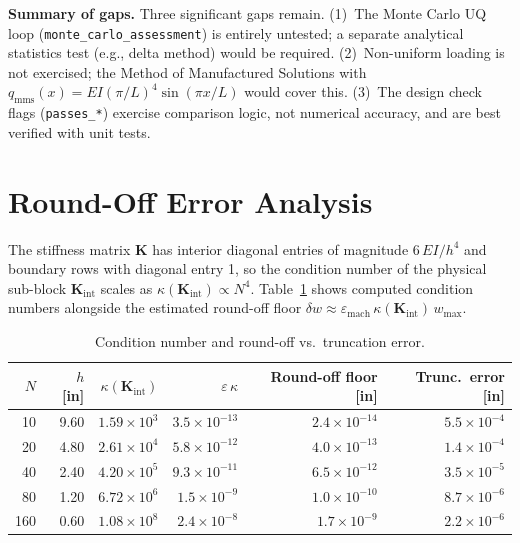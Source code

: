 \documentclass[12pt, letterpaper]{article}
\newcommand{\EI}{EI}
\begin{document}
\textbf{Summary of gaps.}
Three significant gaps remain.
(1)~The Monte Carlo UQ loop (\texttt{monte\_carlo\_assessment}) is entirely
untested; a separate analytical statistics test (e.g., delta method) would be
required.
(2)~Non-uniform loading is not exercised; the Method of Manufactured Solutions
with $q_{\mathrm{mms}}(x) = EI(\pi/L)^4\sin(\pi x/L)$ would cover this.
(3)~The design check flags (\texttt{passes\_*}) exercise comparison logic, not
numerical accuracy, and are best verified with unit tests.

\section{Round-Off Error Analysis}

The stiffness matrix $\mathbf{K}$ has interior diagonal entries of magnitude
$6\,\EI/h^4$ and boundary rows with diagonal entry 1, so the condition number
of the physical sub-block $\mathbf{K}_{\mathrm{int}}$ scales as
$\kappa(\mathbf{K}_{\mathrm{int}}) \propto N^4$.
Table~\ref{tab:roundoff} shows computed condition numbers alongside the
estimated round-off floor $\delta w \approx \varepsilon_{\mathrm{mach}}\,
\kappa(\mathbf{K}_{\mathrm{int}})\,w_{\max}$.

\begin{table}[ht]
\centering
\caption{Condition number and round-off vs.\ truncation error.}
\label{tab:roundoff}
\begin{tabular}{rrrrrr}
\toprule
$N$ & $h$ [in] & $\kappa(\mathbf{K}_{\mathrm{int}})$ &
$\varepsilon\,\kappa$ & Round-off floor [in] & Trunc.\ error [in] \\
\midrule
 10 & 9.60 & $1.59\times10^{3}$ & $3.5\times10^{-13}$ & $2.4\times10^{-14}$ & $5.5\times10^{-4}$ \\
 20 & 4.80 & $2.61\times10^{4}$ & $5.8\times10^{-12}$ & $4.0\times10^{-13}$ & $1.4\times10^{-4}$ \\
 40 & 2.40 & $4.20\times10^{5}$ & $9.3\times10^{-11}$ & $6.5\times10^{-12}$ & $3.5\times10^{-5}$ \\
 80 & 1.20 & $6.72\times10^{6}$ & $1.5\times10^{-9}$  & $1.0\times10^{-10}$ & $8.7\times10^{-6}$ \\
160 & 0.60 & $1.08\times10^{8}$ & $2.4\times10^{-8}$  & $1.7\times10^{-9}$  & $2.2\times10^{-6}$ \\
\bottomrule
\end{tabular}
\end{table}
\end{document}
